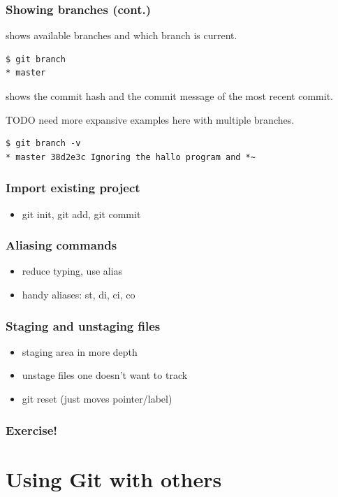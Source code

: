 \documentclass{git_course}
\begin{document}
\begin{frame}[fragile]
\frametitle{Showing branches (cont.)}
 shows available branches and which branch is
current.

\begin{lstlisting}
$ git branch
* master
\end{lstlisting}

 shows the commit hash and the commit
message of the most recent commit.

TODO need more expansive examples here with multiple branches.

\begin{lstlisting}
$ git branch -v
* master 38d2e3c Ignoring the hallo program and *~
\end{lstlisting}
\end{frame}

\begin{frame}
\frametitle{Import existing project}
\begin{itemize}
    \item git init, git add, git commit
\end{itemize}
\end{frame}

\begin{frame}
\frametitle{Aliasing commands}
\begin{itemize}
    \item reduce typing, use alias
    \item handy aliases: st, di, ci, co
\end{itemize}
\end{frame}

\begin{frame}
\frametitle{Staging and unstaging files}
\begin{itemize}
    \item staging area in more depth
    \item unstage files one doesn't want to track
    \item git reset (just moves pointer/label)
\end{itemize}
\end{frame}

\begin{frame}
\frametitle{Exercise!}
\end{frame}

\section{Using Git with others}
\end{document}
